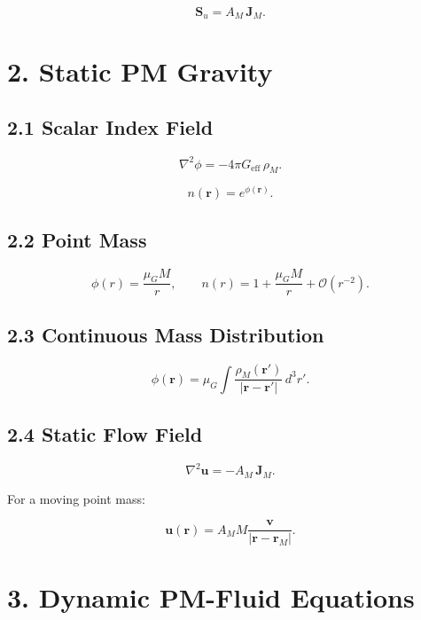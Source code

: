 \documentclass{article}
\begin{document}
\[
\mathbf S_u = A_M\,\mathbf J_M.
\]



\section*{2. Static PM Gravity}

\subsection*{2.1 Scalar Index Field}


\[
\nabla^2 \phi = -4\pi G_{\mathrm{eff}}\,\rho_M.
\]




\[
n(\mathbf r) = e^{\phi(\mathbf r)}.
\]



\subsection*{2.2 Point Mass}


\[
\phi(r) = \frac{\mu_G M}{r},
\qquad
n(r) = 1 + \frac{\mu_G M}{r} + \mathcal{O}(r^{-2}).
\]



\subsection*{2.3 Continuous Mass Distribution}


\[
\phi(\mathbf r)
= \mu_G \int \frac{\rho_M(\mathbf r')}{|\mathbf r - \mathbf r'|}\,d^3r'.
\]



\subsection*{2.4 Static Flow Field}


\[
\nabla^2 \mathbf u = -A_M\,\mathbf J_M.
\]


For a moving point mass:


\[
\mathbf u(\mathbf r)
= A_M M \frac{\mathbf v}{|\mathbf r - \mathbf r_M|}.
\]



\section*{3. Dynamic PM-Fluid Equations}
\end{document}
